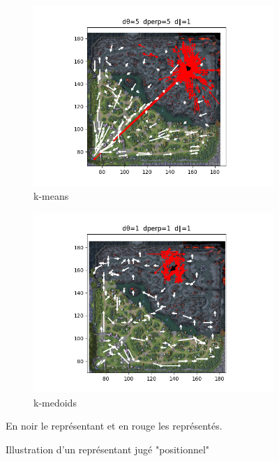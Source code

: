 \begin{figure}[h!]
     \centering
     \begin{subfigure}[b]{0.4\textwidth}
         \centering
         \includegraphics[width=\textwidth]{Images/kmeans/kmeansdBis_show_cluster_short.png}
         \caption{k-means}
         \label{fig:kmean_short}
     \end{subfigure}
     \hfill
     \begin{subfigure}[b]{0.4\textwidth}
         \centering
         \includegraphics[width=\textwidth]{Images/kmedoid/kmed_212_show_cluster_short.png}
         \caption{k-medoids}
         \label{fig:kmed_short}
     \end{subfigure}
     
     En noir le représentant et en rouge les représentés.
     \caption{Illustration d'un représentant jugé "positionnel"}
     \label{fig:short}
\end{figure}

